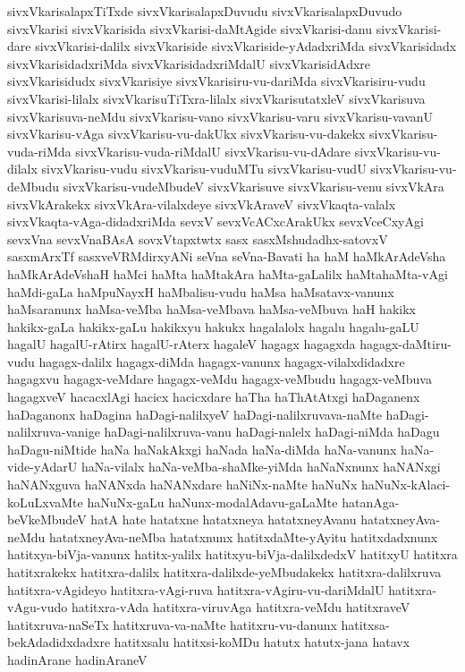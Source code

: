{sivxVkarisalapxTiTxde
sivxVkarisalapxDuvudu
sivxVkarisalapxDuvudo
sivxVkarisi
sivxVkarisida
sivxVkarisi-daMtAgide
sivxVkarisi-danu
sivxVkarisi-dare
sivxVkarisi-dalilx
sivxVkariside
sivxVkariside-yAdadxriMda
sivxVkarisidadx
sivxVkarisidadxriMda
sivxVkarisidadxriMdalU
sivxVkarisidAdxre
sivxVkarisidudx
sivxVkarisiye
sivxVkarisiru-vu-dariMda
sivxVkarisiru-vudu
sivxVkarisi-lilalx
sivxVkarisuTiTxra-lilalx
sivxVkarisutatxleV
sivxVkarisuva
sivxVkarisuva-neMdu
sivxVkarisu-vano
sivxVkarisu-varu
sivxVkarisu-vavanU
sivxVkarisu-vAga
sivxVkarisu-vu-dakUkx
sivxVkarisu-vu-dakekx
sivxVkarisu-vuda-riMda
sivxVkarisu-vuda-riMdalU
sivxVkarisu-vu-dAdare
sivxVkarisu-vu-dilalx
sivxVkarisu-vudu
sivxVkarisu-vuduMTu
sivxVkarisu-vudU
sivxVkarisu-vu-deMbudu
sivxVkarisu-vudeMbudeV
sivxVkarisuve
sivxVkarisu-venu
sivxVkAra
sivxVkArakekx
sivxVkAra-vilalxdeye
sivxVkAraveV
sivxVkaqta-valalx
sivxVkaqta-vAga-didadxriMda
sevxV
sevxVcACxcArakUkx
sevxVceCxyAgi
sevxVna
sevxVnaBAsA
sovxVtapxtwtx
sasx
sasxMshudadhx-satovxV
sasxmArxTf
sasxveVRMdirxyANi
seVna
seVna-Bavati
ha
haM
haMkArAdeVsha
haMkArAdeVshaH
haMci
haMta
haMtakAra
haMta-gaLalilx
haMtahaMta-vAgi
haMdi-gaLa
haMpuNayxH
haMbalisu-vudu
haMsa
haMsatavx-vanunx
haMsaranunx
haMsa-veMba
haMsa-veMbava
haMsa-veMbuva
haH
hakikx
hakikx-gaLa
hakikx-gaLu
hakikxyu
hakukx
hagalalolx
hagalu
hagalu-gaLU
hagalU
hagalU-rAtirx
hagalU-rAterx
hagaleV
hagagx
hagagxda
hagagx-daMtiru-vudu
hagagx-dalilx
hagagx-diMda
hagagx-vanunx
hagagx-vilalxdidadxre
hagagxvu
hagagx-veMdare
hagagx-veMdu
hagagx-veMbudu
hagagx-veMbuva
hagagxveV
hacacxlAgi
hacicx
hacicxdare
haTha
haThAtAtxgi
haDaganenx
haDaganonx
haDagina
haDagi-nalilxyeV
haDagi-nalilxruvava-naMte
haDagi-nalilxruva-vanige
haDagi-nalilxruva-vanu
haDagi-nalelx
haDagi-niMda
haDagu
haDagu-niMtide
haNa
haNakAkxgi
haNada
haNa-diMda
haNa-vanunx
haNa-vide-yAdarU
haNa-vilalx
haNa-veMba-shaMke-yiMda
haNaNxnunx
haNANxgi
haNANxguva
haNANxda
haNANxdare
haNiNx-naMte
haNuNx
haNuNx-kAlaci-koLuLxvaMte
haNuNx-gaLu
haNunx-modalAdavu-gaLaMte
hatanAga-beVkeMbudeV
hatA
hate
hatatxne
hatatxneya
hatatxneyAvanu
hatatxneyAva-neMdu
hatatxneyAva-neMba
hatatxnunx
hatitxdaMte-yAyitu
hatitxdadxnunx
hatitxya-biVja-vanunx
hatitx-yalilx
hatitxyu-biVja-dalilxdedxV
hatitxyU
hatitxra
hatitxrakekx
hatitxra-dalilx
hatitxra-dalilxde-yeMbudakekx
hatitxra-dalilxruva
hatitxra-vAgideyo
hatitxra-vAgi-ruva
hatitxra-vAgiru-vu-dariMdalU
hatitxra-vAgu-vudo
hatitxra-vAda
hatitxra-viruvAga
hatitxra-veMdu
hatitxraveV
hatitxruva-naSeTx
hatitxruva-va-naMte
hatitxru-vu-danunx
hatitxsa-bekAdadidxdadxre
hatitxsalu
hatitxsi-koMDu
hatutx
hatutx-jana
hatavx
hadinArane
hadinAraneV
}
